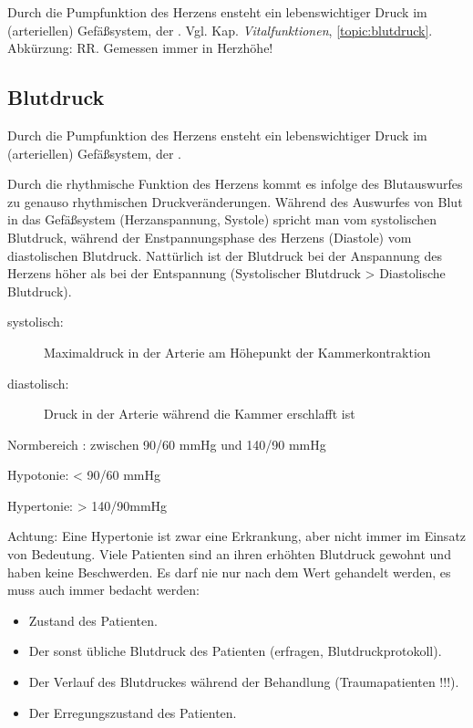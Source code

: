 Durch die Pumpfunktion des Herzens ensteht ein
lebenswichtiger Druck im (arteriellen) Gefäßsystem, der
. Vgl. Kap. \emph{Vitalfunktionen},
\ref{topic:blutdruck}. Abk\"urzung: RR. Gemessen immer in Herzh\"ohe!

\subsection{Blutdruck} 

Durch die Pumpfunktion des Herzens ensteht ein
lebenswichtiger Druck im (arteriellen) Gefäßsystem, der
.

\gMarried
{Durch die rhythmische Funktion des
Herzens kommt es infolge des Blutauswurfes zu genauso rhythmischen Druckveränderungen.
Während des Auswurfes von Blut in das
Gefäßsystem (Herzanspannung, Systole)
spricht man vom systolischen Blutdruck, während
der Enstpannungsphase des Herzens (Diastole) vom
diastolischen Blutdruck. Nattürlich ist der Blutdruck bei
der Anspannung des Herzens höher als bei der Entspannung
(Systolischer Blutdruck > Diastolische Blutdruck).}
{\begin{description}
    \item[systolisch:] Maximaldruck in der Arterie am H\"ohepunkt der
Kammerkontraktion
    \item[diastolisch:] Druck in der Arterie w\"ahrend die Kammer erschlafft ist
\end{description}}







Normbereich : zwischen 90/60 mmHg und 140/90 mmHg  

Hypotonie:  {\textless} 90/60 mmHg

Hypertonie: {\textgreater} 140/90mmHg  

Achtung: Eine Hypertonie ist zwar eine Erkrankung, aber nicht immer im
Einsatz von Bedeutung. Viele Patienten sind an ihren erh\"ohten
Blutdruck gewohnt und haben keine Beschwerden. Es darf nie nur nach dem
Wert gehandelt werden, es muss auch immer bedacht werden: 

\begin{itemize}
\item Zustand des Patienten.

\item Der sonst \"ubliche Blutdruck des Patienten (erfragen,
Blutdruckprotokoll).

\item Der Verlauf des Blutdruckes w\"ahrend der Behandlung
(Traumapatienten !!!).

\item Der Erregungszustand des Patienten.

\end{itemize}

